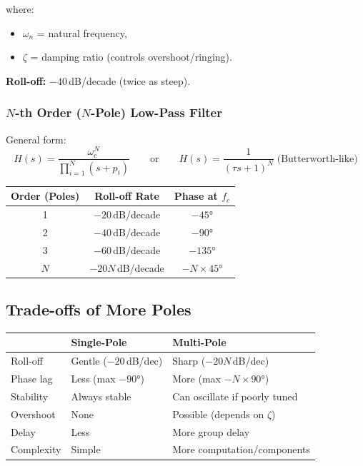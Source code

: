 \documentclass[12pt,a4paper]{article}
\begin{document}
where:
\begin{itemize}
    \item $\omega_n$ = natural frequency,
    \item $\zeta$ = damping ratio (controls overshoot/ringing).
\end{itemize}

\textbf{Roll-off:} $-40$\,dB/decade (twice as steep).

\subsubsection{$N$-th Order ($N$-Pole) Low-Pass Filter}

General form:
\begin{equation}
    H(s) = \frac{\omega_c^N}{\displaystyle\prod_{i=1}^{N}(s + p_i)}
    \qquad\text{or}\qquad
    H(s) = \frac{1}{(\tau s + 1)^N} \;\text{(Butterworth-like)}
\end{equation}

\begin{center}
\begin{tabular}{ccc}
    \toprule
    \textbf{Order (Poles)} & \textbf{Roll-off Rate} & \textbf{Phase at $f_c$} \\
    \midrule
    1 & $-20$\,dB/decade  & $-45°$  \\
    2 & $-40$\,dB/decade  & $-90°$  \\
    3 & $-60$\,dB/decade  & $-135°$ \\
    $N$ & $-20N$\,dB/decade & $-N \times 45°$ \\
    \bottomrule
\end{tabular}
\end{center}

\subsection{Trade-offs of More Poles}

\begin{center}
\begin{tabular}{lll}
    \toprule
    & \textbf{Single-Pole} & \textbf{Multi-Pole} \\
    \midrule
    Roll-off    & Gentle ($-20$\,dB/dec)  & Sharp ($-20N$\,dB/dec) \\
    Phase lag   & Less (max $-90°$)       & More (max $-N\times 90°$) \\
    Stability   & Always stable           & Can oscillate if poorly tuned \\
    Overshoot   & None                    & Possible (depends on $\zeta$) \\
    Delay       & Less                    & More group delay \\
    Complexity  & Simple                  & More computation/components \\
    \bottomrule
\end{tabular}
\end{center}
\end{document}
